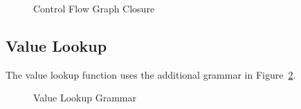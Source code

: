 \documentclass{article}
\begin{document}
    \begin{figure}
        \begin{mathpar}


        \end{mathpar}
        \caption{Control Flow Graph Closure}
        \label{fig_cfgClosure}
    \end{figure}

    \subsection{Value Lookup}

    The value lookup function uses the additional grammar in Figure~\ref{fig_valueLookupGrammar}.

    \begin{figure}
        \begin{grammar}
        \end{grammar}
        \caption{Value Lookup Grammar}
        \label{fig_valueLookupGrammar}
    \end{figure}
\end{document}
